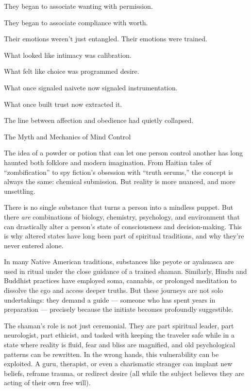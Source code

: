 They began to associate wanting with permission.

They began to associate compliance with worth.

Their emotions weren’t just entangled. 
Their emotions were trained.

What looked like intimacy was calibration.

What felt like choice was programmed desire.

What once signaled naivete now signaled instrumentation.

What once built trust now extracted it.

The line between affection and obedience had quietly collapsed.


\medskip

\begin{PsychologicalSidebar}{The Myth and Mechanics of Mind Control}

  The idea of a powder or potion that can let one person control another has long haunted both folklore and modern 
  imagination. From Haitian tales of “zombification” to spy fiction's obsession with “truth serums,” the concept is 
  always the same: chemical submission. But reality is more nuanced, and more unsettling.

  \medskip
  
  There is no single substance that turns a person into a mindless puppet. But there \emph{are} combinations of biology, 
  chemistry, psychology, and environment that can drastically alter a person’s state of consciousness and decision-making. 
  This is why altered states have long been part of spiritual traditions, and why they’re never entered alone.

  \medskip
  
  In many Native American traditions, substances like peyote or ayahuasca are used in ritual under the close guidance of 
  a trained shaman. Similarly, Hindu and Buddhist practices have employed soma, cannabis, or prolonged meditation 
  to dissolve the ego and access deeper truths. But these journeys are not solo undertakings: they demand a guide — 
  someone who has spent years in preparation — precisely because the initiate becomes profoundly suggestible. 

  \medskip
  
  The shaman’s role is not just ceremonial. They are part spiritual leader, part neurologist, part ethicist, and tasked with 
  keeping the traveler safe while in a state where reality is fluid, fear and bliss are magnified, and old psychological 
  patterns can be rewritten. In the wrong hands, this vulnerability can be exploited. A guru, therapist, or even a 
  charismatic stranger can implant new beliefs, reframe trauma, or redirect desire (all while the subject believes they 
  are acting of their own free will).


\end{PsychologicalSidebar}
